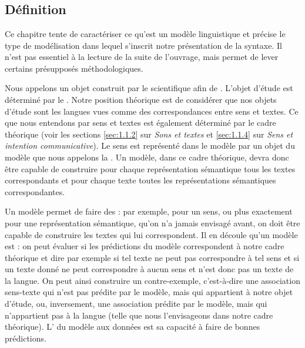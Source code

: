 \chapter{}\label{sec:1.3}

\section{Définition}\label{sec:1.3.0}

Ce chapitre tente de caractériser ce qu’est un modèle linguistique et précise le type de modélisation dans lequel s’inscrit notre présentation de la syntaxe. Il n’est pas essentiel à la lecture de la suite de l’ouvrage, mais permet de lever certains présupposés méthodologiques.

Nous appelons  un objet construit par le scientifique afin de  . L’objet d’étude est déterminé par le . Notre position théorique est de considérer que nos objets d’étude sont les langues vues comme des correspondances entre sens et textes. Ce que nous entendons par sens et textes est également déterminé par le cadre théorique (voir les sections \ref{sec:1.1.2} sur \textit{Sons et textes} et \ref{sec:1.1.4} sur \textit{Sens et intention communicative}). Le sens est représenté dans le modèle par un objet du modèle que nous appelons la . Un modèle, dans ce cadre théorique, devra donc être capable de construire pour chaque représentation sémantique tous les textes correspondants et pour chaque texte toutes les représentations sémantiques correspondantes.

Un modèle permet de faire des  : par exemple, pour un sens, ou plus exactement pour une représentation sémantique, qu’on n’a jamais envisagé avant, on doit être capable de construire les textes qui lui correspondent. Il en découle qu’un modèle est  : on peut évaluer si les prédictions du modèle correspondent à notre cadre théorique et dire par exemple si tel texte ne peut pas correspondre à tel sens et si un texte donné ne peut correspondre à aucun sens et n’est donc pas un texte de la langue. On peut ainsi construire un contre-exemple, c’est-à-dire une association sens-texte qui n’est pas prédite par le modèle, mais qui appartient à notre objet d’étude, ou, inversement, une association prédite par le modèle, mais qui n’appartient pas à la langue (telle que nous l’envisageons dans notre cadre théorique). L’ du modèle aux données est sa capacité à faire de bonnes prédictions.

